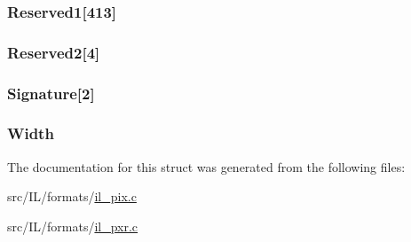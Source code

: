 \hypertarget{struct_p_i_x_h_e_a_d_acadb44810d3d0ff65dc9452ca84693c9}{
\subsubsection[{Reserved1}]{ Reserved1\mbox{[}413\mbox{]}}}\label{struct_p_i_x_h_e_a_d_acadb44810d3d0ff65dc9452ca84693c9}
\hypertarget{struct_p_i_x_h_e_a_d_a3e70979be1ffec78a081e0b473ab2007}{
\subsubsection[{Reserved2}]{ Reserved2\mbox{[}4\mbox{]}}}\label{struct_p_i_x_h_e_a_d_a3e70979be1ffec78a081e0b473ab2007}
\hypertarget{struct_p_i_x_h_e_a_d_a6ec4a80be3b5d31ee76128ca1a9c7fa6}{
\subsubsection[{Signature}]{ Signature\mbox{[}2\mbox{]}}}\label{struct_p_i_x_h_e_a_d_a6ec4a80be3b5d31ee76128ca1a9c7fa6}
\hypertarget{struct_p_i_x_h_e_a_d_aed0f0a923b8346ba51a4de45fff77ee7}{
\subsubsection[{Width}]{ Width}}\label{struct_p_i_x_h_e_a_d_aed0f0a923b8346ba51a4de45fff77ee7}


The documentation for this struct was generated from the following files\-:\begin{DoxyCompactItemize}
\item 
src/\-I\-L/formats/\hyperlink{il__pix_8c}{il\-\_\-pix.\-c}\item 
src/\-I\-L/formats/\hyperlink{il__pxr_8c}{il\-\_\-pxr.\-c}\end{DoxyCompactItemize}
